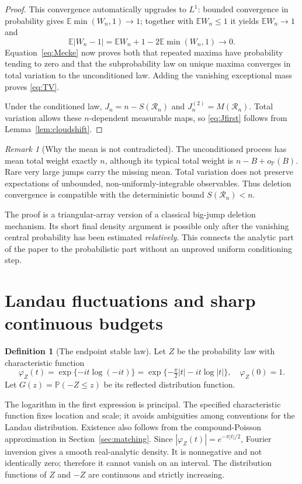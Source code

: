 \documentclass[11pt,a4paper]{article}
\theoremstyle{definition}\newtheorem{definition}[theorem]{Definition}
\theoremstyle{remark}\newtheorem{remark}[theorem]{Remark}
\newcommand{\Prob}{\mathbb P}
\newcommand{\E}{\mathbb E}
\newcommand{\1}{\mathbf 1}
\begin{document}
\begin{proof}
This convergence automatically upgrades to $L^1$: bounded convergence
in probability gives $\E\min(W_n,1)\to1$; together with $\E W_n\le1$
it yields $\E W_n\to1$ and
\[
 \E|W_n-1|=\E W_n+1-2\E\min(W_n,1)\longrightarrow0.
\]
Equation~\eqref{eq:Mecke} now proves both that repeated maxima have
probability tending to zero and that the subprobability law on unique
maxima converges in total variation to the unconditioned law. Adding the
vanishing exceptional mass proves \eqref{eq:TV}.

Under the conditioned law, $J_n=n-S(\mathcal R_n)$ and
$J_n^{(2)}=M(\mathcal R_n)$. Total variation allows these
$n$-dependent measurable maps, so \eqref{eq:Jfirst} follows from
Lemma~\ref{lem:cloudshift}.
\end{proof}

\begin{remark}[Why the mean is not contradicted]
The unconditioned process has mean total weight exactly $n$, although
its typical total weight is $n-B+o_{\Prob}(B)$. Rare very large jumps
carry the missing mean. Total variation does not preserve expectations
of unbounded, non-uniformly-integrable observables. Thus deletion
convergence is compatible with the deterministic bound
$S(\mathcal R_n)<n$.
\end{remark}

The proof is a triangular-array version of a classical big-jump
deletion mechanism. Its short final density argument is possible only
after the vanishing central probability has been estimated
\emph{relatively}. This connects the analytic part of the paper to the
probabilistic part without an unproved uniform conditioning step.

\section{Landau fluctuations and sharp continuous budgets}
\label{sec:landau}

\begin{definition}[The endpoint stable law]\label{def:Z}
Let $Z$ be the probability law with characteristic function
\begin{equation}\label{eq:LandauCF}
 \varphi_Z(t)=\exp\{-it\log(-it)\}
 =\exp\{-\tfrac\pi2|t|-it\log|t|\},
 \quad \varphi_Z(0)=1.
\end{equation}
Let $G(z)=\Prob(-Z\le z)$ be its reflected distribution function.
\end{definition}
The logarithm in the first expression is principal. The specified
characteristic function fixes location and scale; it avoids ambiguities
among conventions for the Landau distribution. Existence also follows
from the compound-Poisson approximation in Section~\ref{sec:matching}.
Since $|\varphi_Z(t)|=e^{-\pi|t|/2}$, Fourier inversion gives a smooth
real-analytic density. It is nonnegative and not identically zero;
therefore it cannot vanish on an interval. The distribution functions of
$Z$ and $-Z$ are continuous and strictly increasing.
\end{document}
